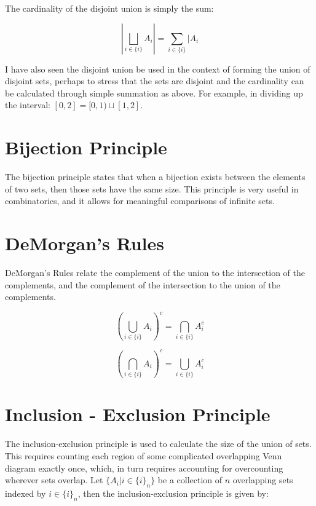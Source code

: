 The cardinality of the disjoint union is simply the sum:

\begin{equation}
\left|\bigsqcup_{i\in\{i\}}A_i\right| = \sum_{i\in\{i\}}|A_i
\end{equation}

I have also seen the disjoint union be used in the context of forming the union of disjoint sets, perhaps to stress that the sets are disjoint and the cardinality can be calculated through simple summation as above. For example, in dividing up the interval: $[0,2]=[0,1)\sqcup[1,2]$.


\section{Bijection Principle}
The bijection principle states that when a bijection exists between the elements of two sets, then those sets have the same size. This principle is very useful in combinatorics, and it allows for meaningful comparisons of infinite sets.


\section{DeMorgan's Rules}
\label{sec:demorgan}
DeMorgan's Rules relate the complement of the union to the intersection of the complements, and the complement of the intersection to the union of the complements.

\begin{equation}
\left(\bigcup_{i\in\{i\}}A_i\right)^c = \bigcap_{i\in\{i\}}A^c_i
\end{equation}

\begin{equation}
\left(\bigcap_{i\in\{i\}}A_i\right)^c = \bigcup_{i\in\{i\}}A^c_i
\end{equation}


\section{Inclusion - Exclusion Principle}
\label{sec:inclusionexclusion}

The inclusion-exclusion principle is used to calculate the size of the union of sets. This requires counting each region of some complicated overlapping Venn diagram exactly once, which, in turn requires accounting for overcounting wherever sets overlap. Let $\{A_i | i\in \{i\}_n \}$ be a collection of $n$ overlapping sets indexed by $i\in \{i\}_n$, then the inclusion-exclusion principle is given by:

